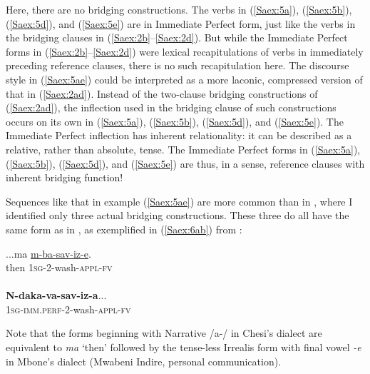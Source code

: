 \documentclass[output=paper]{LSP/langsci}
\begin{document}
Here, there are no bridging constructions. The verbs in (\ref{Saex:5a}), (\ref{Saex:5b}), (\ref{Saex:5d}), and (\ref{Saex:5e}) are in Immediate Perfect form, just like the verbs in the bridging clauses in (\ref{Saex:2b}--\ref{Saex:2d}). But while the Immediate Perfect forms in (\ref{Saex:2b}--\ref{Saex:2d}) were lexical recapitulations of verbs in immediately preceding reference clauses, there is no such recapitulation here. The discourse style in (\ref{Saex:5ae}) could be interpreted as a more laconic, compressed version of that in (\ref{Saex:2ad}). Instead of the two-clause bridging constructions of (\ref{Saex:2ad}), the inflection used in the bridging clause of such constructions occurs on its own in (\ref{Saex:5a}), (\ref{Saex:5b}), (\ref{Saex:5d}), and (\ref{Saex:5e}). The Immediate Perfect inflection has inherent relationality: it can be described as a relative, rather than absolute, tense. The Immediate Perfect forms in (\ref{Saex:5a}), (\ref{Saex:5b}), (\ref{Saex:5d}), and (\ref{Saex:5e}) are thus, in a sense, reference clauses with inherent bridging function!

Sequences like that in example (\ref{Saex:5ae}) are more common than  in \citet{Mbone2014}, where I identified only three actual bridging constructions. These three do all have the same form as in \citet{Chesi2014}, as exemplified in (\ref{Saex:6ab}) from \citet{Mbone2014}:


\begin{exe}
\ex \label{Saex:6ab}
\begin{xlist}
\ex \label{Saex:6a}
\gll ...ma  \underline{m-ba-sav-iz-e}. \\
then  \textsc{1sg}-2-wash-\textsc{appl-fv}\\
\glt {}\\
\ex \label{Saex:6b}
\gll \textbf{N-daka-va-sav-iz-a}...\\     	       
    \textsc{1sg-imm.perf-}2-wash-\textsc{appl-fv}\\
\glt {} 
\end{xlist}
\end{exe}

Note that the forms beginning with Narrative /a-/ in Chesi’s dialect are equivalent to \textit{ma} `then' followed by the tense-less Irrealis form with final vowel \textit{-e} in Mbone’s dialect (Mwabeni Indire, personal communication).
%
\end{document}
